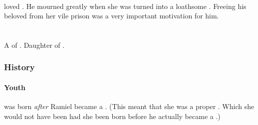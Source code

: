 \subsubsection{\Essenai}
\Sithiyacaan loved \Essenai. 
He mourned greatly when she was turned into a loathsome \sephirah. 
Freeing his beloved from her vile prison was a very important motivation for him. 























\chapter[Mystracht]{\Mystraacht}















\section{\Cishiel}
\index{\Cishiel}
A \ketheran{} \resvil{} of \Mystraacht. 
Daughter of . 









\subsection{History}





\subsubsection{Youth}
\Cishiel{} was born \emph{after} Ramiel became a \sathariah. 
(This meant that she was a proper \ketheran. Which she would not have been had she been born before he actually became a \sathariah.) 





